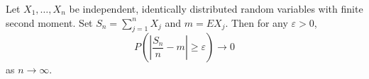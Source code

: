 Let $X_1, \ldots, X_n$ be independent, identically distributed random variables with finite second moment. Set $S_n = \sum_{j=1}^{n} X_j$ and $m = EX_j$. Then for any $\varepsilon > 0$,
$$P\left(\left|\frac{S_n}{n} - m\right| \geq \varepsilon\right) \to 0$$
as $n \to \infty$.
